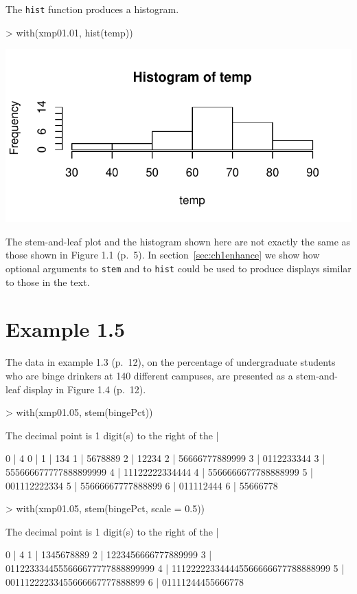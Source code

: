 \documentclass{book}
\begin{document}
The \texttt{hist} function produces a histogram.
\begin{center}
\begin{Schunk}
\begin{Sinput}
> with(xmp01.01, hist(temp))
\end{Sinput}
\end{Schunk}
\includegraphics{Devore6-009}
\end{center}

The stem-and-leaf plot and the histogram shown here are not exactly
the same as those shown in Figure 1.1 (p.~5).  In
section~\ref{sec:ch1enhance} we show how optional arguments to
\texttt{stem} and to \texttt{hist} could be used to produce displays
similar to those in the text.

\section{Example 1.5}
\label{sec:xmp01.05}

The data in example 1.3 (p.~12), on the percentage of undergraduate
students who are binge drinkers at 140 different campuses, are
presented as a stem-and-leaf display in Figure 1.4 (p.~12).
\begin{Schunk}
\begin{Sinput}
> with(xmp01.05, stem(bingePct))
\end{Sinput}
\begin{Soutput}
  The decimal point is 1 digit(s) to the right of the |

  0 | 4
  0 | 
  1 | 134
  1 | 5678889
  2 | 12234
  2 | 56666777889999
  3 | 0112233344
  3 | 555666677777888899999
  4 | 11122222334444
  4 | 5566666677788888999
  5 | 001112222334
  5 | 55666667777888899
  6 | 011112444
  6 | 55666778
\end{Soutput}
\begin{Sinput}
> with(xmp01.05, stem(bingePct, scale = 0.5))
\end{Sinput}
\begin{Soutput}
  The decimal point is 1 digit(s) to the right of the |

  0 | 4
  1 | 1345678889
  2 | 1223456666777889999
  3 | 0112233344555666677777888899999
  4 | 111222223344445566666677788888999
  5 | 00111222233455666667777888899
  6 | 01111244455666778
\end{Soutput}
\end{Schunk}
\end{document}
